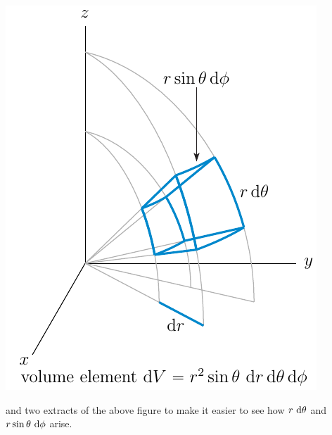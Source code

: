 \begin{efig}
\begin{center}
    \includegraphics{spher5.pdf}
\end{center}
\end{efig}
and two extracts of the above figure to make it easier to see 
how $r\ \mathrm{d}\theta$ and $r\sin\theta\ \mathrm{d}\phi$ arise.

